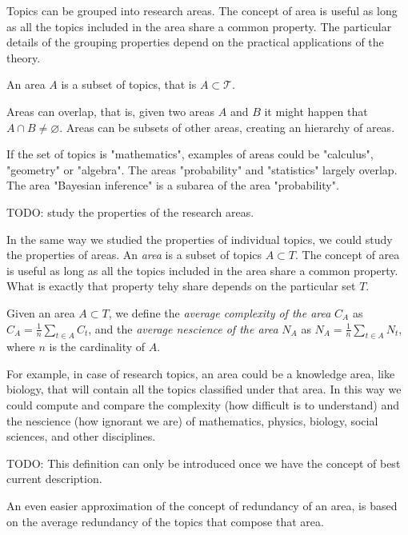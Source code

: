 Topics can be grouped into research areas. The concept of area is useful as long as all the topics included in the area share a common property. The particular details of the grouping properties depend on the practical applications of the theory.

\begin{definition}
An area $A$ is a subset of topics, that is $A \subset \mathcal{T}$.
\end{definition}

Areas can overlap, that is, given two areas $A$ and $B$ it might happen that $A \cap B \neq \varnothing$. Areas can be subsets of other areas, creating an hierarchy of areas.

\begin{example}
If the set of topics is "mathematics", examples of areas could be "calculus", "geometry" or "algebra". The areas "probability" and "statistics" largely overlap. The area "Bayesian inference" is a subarea of the area "probability".
\end{example}

{\color{red} TODO: study the properties of the research areas.}

In the same way we studied the properties of individual topics, we could study the properties of areas. An \emph{area} is a subset of topics $A\subset T$. The concept of area is useful as long as all the topics included in the area share a common property. What is exactly that property tehy share depends on the particular set $T$.

\begin{definition}
Given an area $A\subset T$, we define the \emph{average complexity of the area} $C_{A}$ as $C_{A}=\frac{1}{n}\sum_{t\in A}C_{t}$, and the \emph{average nescience of the area} $N_{A}$ as $N_{A}=\frac{1}{n}\sum_{t\in A}N_{t}$, where $n$ is the cardinality of $A$.
\end{definition}

For example, in case of research topics, an area could be a knowledge area, like biology, that will contain all the topics classified under that area. In this way we could compute and compare the complexity (how difficult is to understand) and the nescience (how ignorant we are) of mathematics, physics, biology, social sciences, and other disciplines.

{\color{red} TODO: This definition can only be introduced once we have the concept of best current description.}

An even easier approximation of the concept of redundancy of an area, is based on the average redundancy of the topics that compose that area.

